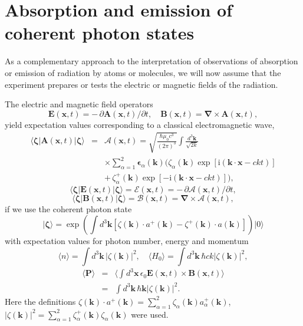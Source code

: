 \documentclass[final,3p,12pt]{elsarticle3}
\begin{document}
\section{Absorption and emission of coherent photon states}
\label{sec:coherent}

As a complementary approach to the interpretation of observations of
absorption or emission of radiation by atoms or molecules, we will now
assume that the experiment prepares or tests the electric or magnetic fields 
of the radiation. 

The electric and magnetic field operators
\[
\bm{E}(\bm{x},t)=-\,\partial\bm{A}(\bm{x},t)/\partial t,\quad
\bm{B}(\bm{x},t)=\bm{\nabla}\times\bm{A}(\bm{x},t),
\]
yield expectation values corresponding to a classical electromagnetic wave,
\begin{eqnarray}\nonumber
\bm{\langle}\bm{\zeta}\bm{|}\bm{A}(\bm{x},t)
\bm{|}\bm{\zeta}\bm{\rangle}
&=&\bm{\mathcal{A}}(\bm{x},t)
=\sqrt{\frac{\hbar\mu_0 c^3}{(2\pi)^3}}
\int\frac{d^3\bm{k}}{\sqrt{2k}}
\\ \nonumber
&&\times
\sum_{\alpha=1}^2
\bm{\epsilon}_\alpha(\bm{k})
\Big(\zeta_\alpha(\bm{k})\exp[\mathrm{i}(\bm{k}\cdot\bm{x}-ckt)]
\\ \label{eq:cohA}
&&
+\,\zeta_{\alpha}^+(\bm{k})\exp[-\mathrm{i}(\bm{k}\cdot\bm{x}-ckt)]
\Big),
\end{eqnarray}
\[
\bm{\langle}\bm{\zeta}\bm{|}\bm{E}(\bm{x},t)
\bm{|}\bm{\zeta}\bm{\rangle}
=\bm{\mathcal{E}}(\bm{x},t)
=-\,\partial\bm{\mathcal{A}}(\bm{x},t)/\partial t,
\]
\[
\bm{\langle}\bm{\zeta}\bm{|}\bm{B}(\bm{x},t)
\bm{|}\bm{\zeta}\bm{\rangle}
=\bm{\mathcal{B}}(\bm{x},t)
=\bm{\nabla}\times\bm{\mathcal{A}}(\bm{x},t),
\]
if we use the coherent photon state \cite{glauber}
\[
\bm{|}\bm{\zeta}\bm{\rangle}=\exp\!\left(\int\!d^3\bm{k}
\left[\zeta(\bm{k})\cdot a^+(\bm{k})
-\zeta^+(\bm{k})\cdot a(\bm{k})\right]\right)\!\bm{|}0\bm{\rangle}
\]
with expectation values for photon number, energy and momentum
\[
\langle n\rangle=\int\!d^3\bm{k}\,\left|\zeta(\bm{k})\right|^2,
\quad
\langle H_0\rangle=\int\!d^3\bm{k}\,\hbar ck
\left|\zeta(\bm{k})\right|^2,
\]
\begin{eqnarray*}
\langle\bm{P}\rangle&=&
\langle\int\!d^3\bm{x}\,\epsilon_0\bm{E}(\bm{x},t)
\times\bm{B}(\bm{x},t)\rangle
\\
&=&\int\!d^3\bm{k}\,\hbar\bm{k}
\left|\zeta(\bm{k})\right|^2.
\end{eqnarray*}
Here the definitions $\zeta(\bm{k})\cdot a^+(\bm{k})
=\sum_{\alpha=1}^2\zeta_\alpha(\bm{k})a^+_\alpha(\bm{k})$,
$\left|\zeta(\bm{k})\right|^2
=\sum_{\alpha=1}^2\zeta^+_\alpha(\bm{k})\zeta_\alpha(\bm{k})$
were used.
\end{document}
